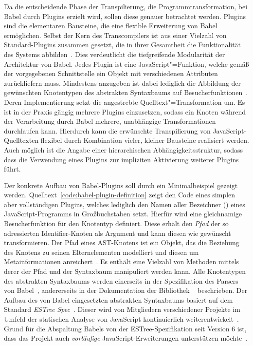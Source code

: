 Da die entscheidende Phase der Transpilierung, die Programmtransformation, bei Babel durch Plugins erzielt wird, sollen diese genauer betrachtet werden. Plugins sind die elementaren Bausteine, die eine flexible Erweiterung von Babel ermöglichen. Selbst der Kern des Transcompilers ist aus einer Vielzahl von Standard-Plugins zusammen gesetzt, die in ihrer Gesamtheit die Funktionalität des Systems abbilden~\autocite{BABEL}. Dies verdeutlicht die tiefgreifende Modularität der Architektur von Babel. Jedes Plugin ist eine JavaScript"=Funktion, welche gemäß der vorgegebenen Schnittstelle ein Objekt mit verschiedenen Attributen zurückliefern muss. Mindestens anzugeben ist dabei lediglich die Abbildung der gewünschten Knotentypen des abstrakten Syntaxbaums auf Besucherfunktionen~\autocite{BABEL:HANDBOOK}. Deren Implementierung setzt die angestrebte Quelltext"=Transformation um. Es ist in der Praxis gängig mehrere Plugins einzusetzen, sodass ein Knoten während der Verarbeitung durch Babel mehrere, unabhängige Transformationen durchlaufen kann. Hierdurch kann die erwünschte Transpilierung von JavaScript-Quelltexten flexibel durch Kombination vieler, kleiner Bausteine realisiert werden. Auch möglich ist die Angabe einer hierarchischen Abhängigkeitsstruktur, sodass dass die Verwendung eines Plugins zur impliziten Aktivierung weiterer Plugins führt.

Der konkrete Aufbau von Babel-Plugins soll durch ein Minimalbeispiel gezeigt werden. Quelltext~\ref{code:babel-plugin-definition} zeigt den Code eines simplen aber vollständigen Plugins, welches lediglich den Namen aller Bezeichner () eines JavaScript-Programms in Großbuchstaben setzt. Hierfür wird eine gleichnamige Besucherfunktion für den Knotentyp  definiert. Diese erhält den \emph{Pfad} der so adressierten Identifier-Knoten als Argument und kann diesen wie gewünscht transformieren. Der Pfad eines AST-Knotens ist ein Objekt, das die Beziehung des Knotens zu seinen Elternelementen modelliert und diesen um Metainformationen anreichert~\autocite{BABEL:HANDBOOK}. Es enthält eine Vielzahl von Methoden mittels derer der Pfad und der Syntaxbaum manipuliert werden kann.
Alle Knotentypen des abstrakten Syntaxbaums werden einerseits in der Spezifikation des Parsers von Babel~\autocite{BABEL:PARSER_SPEC,BABEL:PARSER}, andererseits in der Dokumentation der Bibliothek ~\autocite{BABEL:TYPES} beschrieben. Der Aufbau des von Babel eingesetzten abstrakten Syntaxbaums basiert auf dem Standard \textit{ESTree Spec}~\autocite{ESTREE_SPEC}. Dieser wird von Mitgliedern verschiedener Projekte im Umfeld der statischen Analyse von JavaScript kontinuierlich weiterentwickelt~\autocite{BABEL:PARSER,ESTREE_SPEC}. Grund für die Abspaltung Babels von der ESTree-Spezifikation seit Version 6 ist, dass das Projekt auch \emph{vorläufige} JavaScript-Erweiterungen unterstützen möchte~\autocite{BABEL:STATE_OF_BABEL}.

